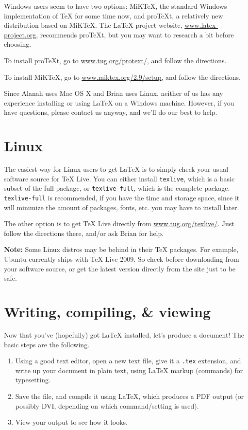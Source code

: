 \documentclass{article}
\newcommand{\note}{\textbf{Note: }}
\begin{document}
Windows users seem to have two options: MiK\TeX{}, the standard Windows
implementation of \TeX{} for some time now, and pro\TeX{}t, a relatively new
distribution based on MiK\TeX{}. The \LaTeX{} project website,
\url{www.latex-project.org}, recommends pro\TeX{}t, but you may want to research
a bit before choosing.

To install pro\TeX{}t, go to \url{www.tug.org/protext/}, and follow the
directions.

To install MiK\TeX{}, go to \url{www.miktex.org/2.9/setup}, and follow the
directions.

Since Alanah uses Mac OS X and Brian uses Linux, neither of us has any
experience installing or using \LaTeX{} on a Windows machine. However, if you
have questions, please contact us anyway, and we'll do our best to help.


\section{Linux}

The easiest way for Linux users to get \LaTeX{} is to simply check your usual
software source for \TeX{} Live. You can either install \texttt{texlive}, which
is a basic subset of the full package, or \texttt{texlive-full}, which is the
complete package. \texttt{texlive-full} is recommended, if you have the time and
storage space, since it will minimize the amount of packages, fonts, etc. you
may have to install later.

The other option is to get \TeX{} Live directly from \url{www.tug.org/texlive/}.
Just follow the directions there, and/or ask Brian for help.

\note Some Linux distros may be behind in their \TeX{} packages. For example,
Ubuntu currently ships with \TeX{} Live 2009. So check before downloading from
your software source, or get the latest version directly from the site just to
be safe.


\section{Writing, compiling, \& viewing}

Now that you've (hopefully) got \LaTeX{} installed, let's produce a document!
The basic steps are the following.

\begin{enumerate}
\item Using a good text editor, open a new text file, give it a \texttt{.tex}
    extension, and write up your document in plain text, using \LaTeX{} markup
    (commands) for typesetting.
\item Save the file, and compile it using \LaTeX{}, which produces a PDF output
    (or possibly DVI, depending on which command/setting is used).
\item View your output to see how it looks.
\end{enumerate}
\end{document}
